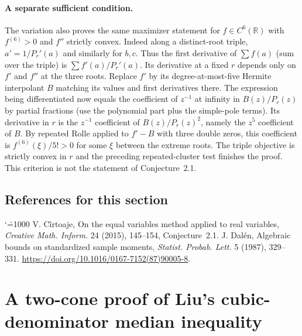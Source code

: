 \documentclass[11pt,a4paper]{article}
\makeatletter
\numberwithin{equation}{section}
\theoremstyle{definition}
\theoremstyle{remark}
\renewenvironment{thebibliography}[1]
 {\subsection*{References for this section}\small
  \list{\@biblabel{\@arabic\c@enumiv}}
       {\settowidth\labelwidth{\@biblabel{#1}}\leftmargin\labelwidth
        \advance\leftmargin\labelsep\@openbib@code
        \usecounter{enumiv}\let\p@enumiv\@empty
        \renewcommand\theenumiv{\@arabic\c@enumiv}}
  \sloppy\clubpenalty4000\widowpenalty4000\sfcode`\.=1000\relax}
 {\def\@noitemerr{\@latex@warning{Empty bibliography}}\endlist}
\makeatother
\begin{document}
\paragraph{A separate sufficient condition.}
The variation also proves the same maximizer statement for $f\in C^6(\mathbb R)$ with $f^{(6)}>0$ and $f''$ strictly convex. Indeed along a distinct-root triple, $a'=1/P_r'(a)$ and similarly for $b,c$. Thus the first derivative of $\sum f(a)$ (sum over the triple) is $\sum f'(a)/P_r'(a)$. Its derivative at a fixed $r$ depends only on $f'$ and $f''$ at the three roots. Replace $f'$ by its degree-at-most-five Hermite interpolant $B$ matching its values and first derivatives there. The expression being differentiated now equals the coefficient of $z^{-1}$ at infinity in $B(z)/P_r(z)$ by partial fractions (use the polynomial part plus the simple-pole terms). Its derivative in $r$ is the $z^{-1}$ coefficient of $B(z)/P_r(z)^2$, namely the $z^5$ coefficient of $B$. By repeated Rolle applied to $f'-B$ with three double zeros, this coefficient is $f^{(6)}(\xi)/5!>0$ for some $\xi$ between the extreme roots. The triple objective is strictly convex in $r$ and the preceding repeated-cluster test finishes the proof. This criterion is not the statement of Conjecture~2.1.

\begin{thebibliography}{9}
 V. C\^irtoaje, On the equal variables method applied to real variables, \emph{Creative Math. Inform.} 24 (2015), 145--154, Conjecture~2.1.
 J. Dal\'en, Algebraic bounds on standardized sample moments, \emph{Statist. Probab. Lett.} 5 (1987), 329--331. \url{https://doi.org/10.1016/0167-7152(87)90005-8}.
\end{thebibliography}

\par\endgroup

\begingroup
\newcommand{\cyc}{\mathop{\sum}_{\rm cyc}}
\section{\texorpdfstring{A two-cone proof of Liu's cubic-denominator median inequality}{A two-cone proof of Liu's cubic-denominator median inequality}}\label{section:r32taisho}
\par\medskip
\end{document}
